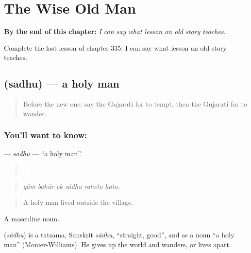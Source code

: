 
\chapter{The Wise Old Man}
\label{ch:gu-the-wise-old-man}

\begin{chapteropening}
\textbf{By the end of this chapter:} \emph{I can say what lesson an old story teaches.}

Complete the last lesson of chapter 335: I can say what lesson an old story teaches.
\end{chapteropening}

\section[\texorpdfstring{\gu{સાધુ} (sādhu)}{સાધુ (sādhu)}]{ (sādhu) — a holy man}

\label{lesson:GU-C335-sadhu}



\begin{quote}
Before the new one: say the Gujarati for to tempt, then the Gujarati for to wander.
\end{quote}

\subsection*{You'll want to know: }
\textbf{} — \emph{sādhu} — \textquotedblleft{}a holy man\textquotedblright{}.

\begin{quote}
     .
\end{quote}

\begin{quote}
\emph{gām bahār ek sādhu raheto hato.}
\end{quote}

\begin{quote}
A holy man lived outside the village.
\end{quote}

A masculine noun.

\begin{cousinweb}
\textbf{} (\emph{sādhu}) is a tatsama, Sanskrit \emph{sādhu}, \textquotedblleft{}straight, good\textquotedblright{}, and as a noun \textquotedblleft{}a holy man\textquotedblright{} (Monier-Williams). He gives up the world and wanders, or lives apart.
\end{cousinweb}

